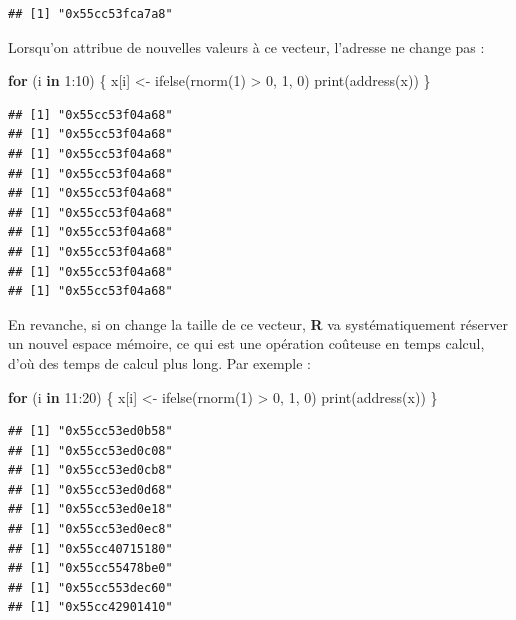 \documentclass[
]{book}
\newenvironment{Shaded}{\begin{snugshade}}{\end{snugshade}}
\newcommand{\ControlFlowTok}[1]{\textcolor[rgb]{0.13,0.29,0.53}{\textbf{#1}}}
\newcommand{\DecValTok}[1]{\textcolor[rgb]{0.00,0.00,0.81}{#1}}
\newcommand{\FunctionTok}[1]{\textcolor[rgb]{0.00,0.00,0.00}{#1}}
\newcommand{\NormalTok}[1]{#1}
\newcommand{\OtherTok}[1]{\textcolor[rgb]{0.56,0.35,0.01}{#1}}
\newcommand{\SpecialCharTok}[1]{\textcolor[rgb]{0.00,0.00,0.00}{#1}}
\theoremstyle{definition}
\theoremstyle{definition}
\theoremstyle{definition}
\theoremstyle{definition}
\theoremstyle{remark}
\begin{document}
\begin{verbatim}
## [1] "0x55cc53fca7a8"
\end{verbatim}

Lorsqu'on attribue de nouvelles valeurs à ce vecteur, l'adresse ne change pas :

\begin{Shaded}
\begin{Highlighting}[]
\ControlFlowTok{for}\NormalTok{ (i }\ControlFlowTok{in} \DecValTok{1}\SpecialCharTok{:}\DecValTok{10}\NormalTok{) \{}
\NormalTok{  x[i] }\OtherTok{\textless{}{-}} \FunctionTok{ifelse}\NormalTok{(}\FunctionTok{rnorm}\NormalTok{(}\DecValTok{1}\NormalTok{) }\SpecialCharTok{\textgreater{}} \DecValTok{0}\NormalTok{, }\DecValTok{1}\NormalTok{, }\DecValTok{0}\NormalTok{)}
  \FunctionTok{print}\NormalTok{(}\FunctionTok{address}\NormalTok{(x))}
\NormalTok{\}}
\end{Highlighting}
\end{Shaded}

\begin{verbatim}
## [1] "0x55cc53f04a68"
## [1] "0x55cc53f04a68"
## [1] "0x55cc53f04a68"
## [1] "0x55cc53f04a68"
## [1] "0x55cc53f04a68"
## [1] "0x55cc53f04a68"
## [1] "0x55cc53f04a68"
## [1] "0x55cc53f04a68"
## [1] "0x55cc53f04a68"
## [1] "0x55cc53f04a68"
\end{verbatim}

En revanche, si on change la taille de ce vecteur, \textbf{R} va systématiquement réserver un nouvel espace mémoire, ce qui est une opération coûteuse en temps calcul, d'où des temps de calcul plus long. Par exemple :

\begin{Shaded}
\begin{Highlighting}[]
\ControlFlowTok{for}\NormalTok{ (i }\ControlFlowTok{in} \DecValTok{11}\SpecialCharTok{:}\DecValTok{20}\NormalTok{) \{}
\NormalTok{  x[i] }\OtherTok{\textless{}{-}} \FunctionTok{ifelse}\NormalTok{(}\FunctionTok{rnorm}\NormalTok{(}\DecValTok{1}\NormalTok{) }\SpecialCharTok{\textgreater{}} \DecValTok{0}\NormalTok{, }\DecValTok{1}\NormalTok{, }\DecValTok{0}\NormalTok{)}
  \FunctionTok{print}\NormalTok{(}\FunctionTok{address}\NormalTok{(x))}
\NormalTok{\}}
\end{Highlighting}
\end{Shaded}

\begin{verbatim}
## [1] "0x55cc53ed0b58"
## [1] "0x55cc53ed0c08"
## [1] "0x55cc53ed0cb8"
## [1] "0x55cc53ed0d68"
## [1] "0x55cc53ed0e18"
## [1] "0x55cc53ed0ec8"
## [1] "0x55cc40715180"
## [1] "0x55cc55478be0"
## [1] "0x55cc553dec60"
## [1] "0x55cc42901410"
\end{verbatim}
\end{document}
